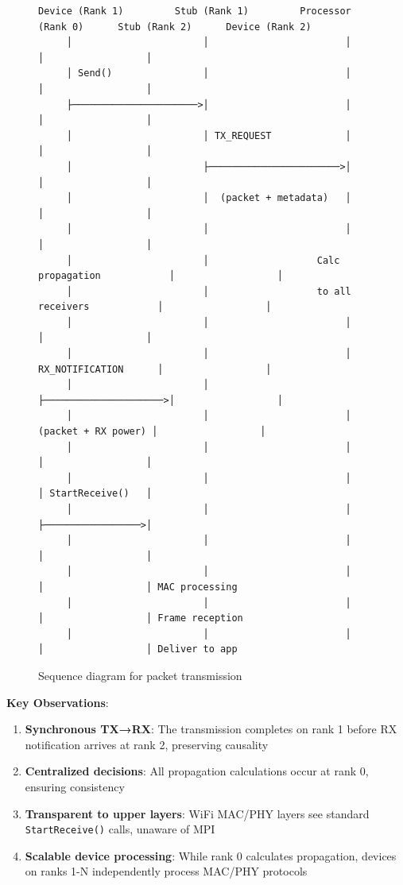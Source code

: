 \begin{figure}[htbp]
\centering
\begin{verbatim}
Device (Rank 1)         Stub (Rank 1)         Processor (Rank 0)      Stub (Rank 2)      Device (Rank 2)
     │                       │                        │                      │                  │
     │ Send()                │                        │                      │                  │
     ├──────────────────────>│                        │                      │                  │
     │                       │ TX_REQUEST             │                      │                  │
     │                       ├───────────────────────>│                      │                  │
     │                       │  (packet + metadata)   │                      │                  │
     │                       │                        │                      │                  │
     │                       │                   Calc propagation            │                  │
     │                       │                   to all receivers            │                  │
     │                       │                        │                      │                  │
     │                       │                        │ RX_NOTIFICATION      │                  │
     │                       │                        ├─────────────────────>│                  │
     │                       │                        │  (packet + RX power) │                  │
     │                       │                        │                      │                  │
     │                       │                        │                      │ StartReceive()   │
     │                       │                        │                      ├─────────────────>│
     │                       │                        │                      │                  │
     │                       │                        │                      │                  │ MAC processing
     │                       │                        │                      │                  │ Frame reception
     │                       │                        │                      │                  │ Deliver to app
\end{verbatim}
\caption{Sequence diagram for packet transmission}
\label{fig:sequence-diagram}
\end{figure}

\textbf{Key Observations}:
\begin{enumerate}
    \item \textbf{Synchronous TX→RX}: The transmission completes on rank 1 before RX notification arrives at rank 2, preserving causality
    \item \textbf{Centralized decisions}: All propagation calculations occur at rank 0, ensuring consistency
    \item \textbf{Transparent to upper layers}: WiFi MAC/PHY layers see standard \texttt{StartReceive()} calls, unaware of MPI
    \item \textbf{Scalable device processing}: While rank 0 calculates propagation, devices on ranks 1-N independently process MAC/PHY protocols
\end{enumerate}


